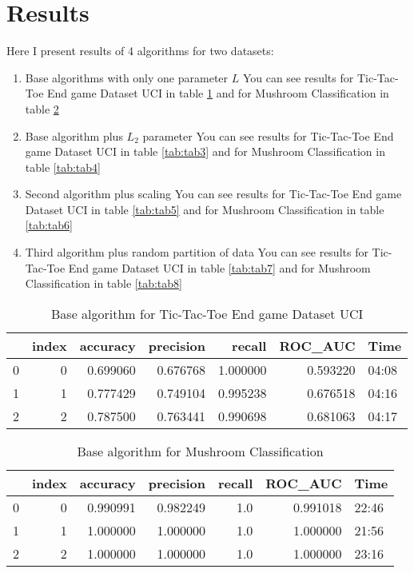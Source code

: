 \documentclass[12t]{article}
\begin{document}
\section{Results}
Here I present results of 4 algorithms for two datasets:
\begin{enumerate}
	\item Base algorithms with only one parameter $L$ 
	You can see results for Tic-Tac-Toe End game Dataset UCI in table \ref{tab:tab1} and for Mushroom Classification in table \ref{tab:tab2}
	\item Base algorithm plus $L_2$ parameter
	You can see results for Tic-Tac-Toe End game Dataset UCI in table \ref{tab:tab3} and for Mushroom Classification in table \ref{tab:tab4}
	\item Second algorithm plus scaling
	You can see results for Tic-Tac-Toe End game Dataset UCI in table \ref{tab:tab5} and for Mushroom Classification in table \ref{tab:tab6}
	\item Third algorithm plus random partition of data
	You can see results for Tic-Tac-Toe End game Dataset UCI in table \ref{tab:tab7} and for Mushroom Classification in table \ref{tab:tab8}
\end{enumerate} 

\begin{table}[H]
\begin{tabular}{lrrrrrl}
	\toprule
	{} &  index &  accuracy &  precision &    recall &   ROC\_AUC &   Time \\
	\midrule
	0 &      0 &  0.699060 &   0.676768 &  1.000000 &  0.593220 &  04:08 \\
	1 &      1 &  0.777429 &   0.749104 &  0.995238 &  0.676518 &  04:16 \\
	2 &      2 &  0.787500 &   0.763441 &  0.990698 &  0.681063 &  04:17 \\
	\bottomrule
\end{tabular}
	\caption{Base algorithm for Tic-Tac-Toe End game Dataset UCI  \label{tab:tab1}}
\end{table}

\begin{table}[H]
\begin{tabular}{lrrrrrl}
	\toprule
	{} &  index &  accuracy &  precision &  recall &   ROC\_AUC &   Time \\
	\midrule
	0 &      0 &  0.990991 &   0.982249 &     1.0 &  0.991018 &  22:46 \\
	1 &      1 &  1.000000 &   1.000000 &     1.0 &  1.000000 &  21:56 \\
	2 &      2 &  1.000000 &   1.000000 &     1.0 &  1.000000 &  23:16 \\
	\bottomrule
\end{tabular}

	\caption{Base algorithm for Mushroom Classification \label{tab:tab2}}
\end{table}
\end{document}
